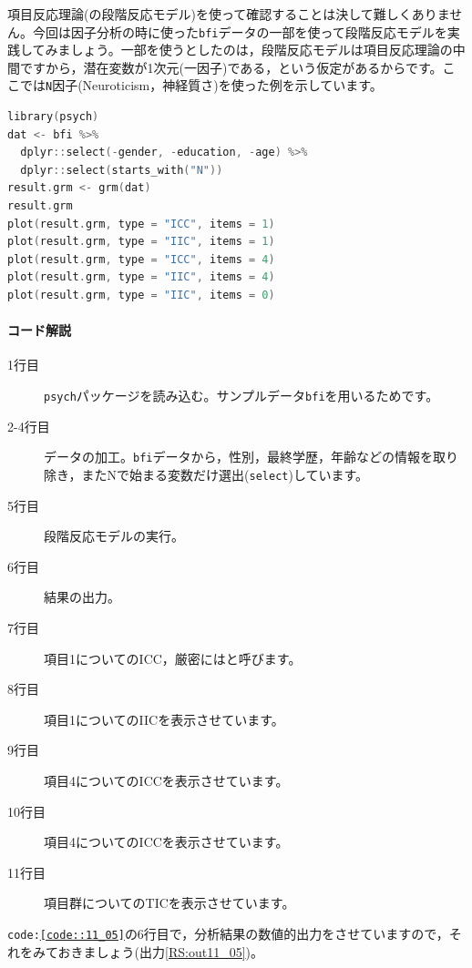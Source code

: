 \documentclass{ltjsbook}
\begin{document}
項目反応理論(の段階反応モデル)を使って確認することは決して難しくありません。今回は因子分析の時に使った\texttt{bfi}データの一部を使って段階反応モデルを実践してみましょう。一部を使うとしたのは，段階反応モデルは項目反応理論の中間ですから，潜在変数が1次元(一因子)である，という仮定があるからです。ここでは\texttt{N}因子(Neuroticism，神経質さ)を使った例を示しています。

\begin{lstlisting}[language=c++,label={code::11_05},caption={GRMの実行}]
library(psych)
dat <- bfi %>%
  dplyr::select(-gender, -education, -age) %>%
  dplyr::select(starts_with("N"))
result.grm <- grm(dat)
result.grm
plot(result.grm, type = "ICC", items = 1)
plot(result.grm, type = "IIC", items = 1)
plot(result.grm, type = "ICC", items = 4)
plot(result.grm, type = "IIC", items = 4)
plot(result.grm, type = "IIC", items = 0)
\end{lstlisting}
        
\paragraph{コード解説}
\begin{description}
        \item[1行目] \texttt{psych}パッケージを読み込む。サンプルデータ\texttt{bfi}を用いるためです。
        \item[2-4行目] データの加工。\texttt{bfi}データから，性別，最終学歴，年齢などの情報を取り除き，またNで始まる変数だけ選出(\texttt{select})しています。
        \item[5行目] 段階反応モデルの実行。
        \item[6行目] 結果の出力。
        \item[7行目] 項目1についてのICC，厳密にはと呼びます。
        \item[8行目] 項目1についてのIICを表示させています。
        \item[9行目] 項目4についてのICCを表示させています。
        \item[10行目] 項目4についてのICCを表示させています。
        \item[11行目]項目群についてのTICを表示させています。  
\end{description}

\texttt{code:\ref{code::11_05}}の6行目で，分析結果の数値的出力をさせていますので，それをみておきましょう(出力\ref{RS:out11_05})。
\end{document}
